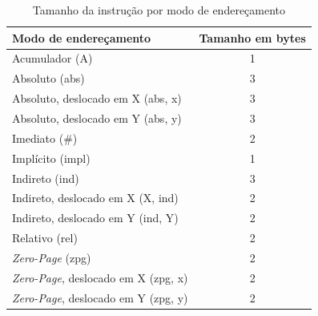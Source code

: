 \documentclass[
	12pt,				  %
	openright,		%
	a4paper,			%
	english,			%
	french,				%
	spanish,			%
	brazil,				%
]{abntex2}
\begin{document}
\begin{table}[htb]
	\centering
	\ABNTEXfontereduzida
	\caption{Tamanho da instrução por modo de endereçamento} \label{tab:Instr3OP}
	\begin{tabular}{|l|c|}
		\hline
		\textbf{Modo de endereçamento}            & \textbf{Tamanho em bytes} \\ \hline
		Acumulador (A)                            & 1                         \\ \hline
		Absoluto (abs)                            & 3                         \\ \hline
		Absoluto, deslocado em X (abs, x)         & 3                         \\ \hline
		Absoluto, deslocado em Y (abs, y)         & 3                         \\ \hline
		Imediato (\#)                             & 2                         \\ \hline
		Implícito (impl)                          & 1                         \\ \hline
		Indireto (ind)                            & 3                         \\ \hline
		Indireto, deslocado em X (X, ind)         & 2                         \\ \hline
		Indireto, deslocado em Y (ind, Y)         & 2                         \\ \hline
		Relativo (rel)                            & 2                         \\ \hline
		\emph{Zero-Page} (zpg)                    & 2                         \\ \hline
		\emph{Zero-Page}, deslocado em X (zpg, x) & 2                         \\ \hline
		\emph{Zero-Page}, deslocado em Y (zpg, y) & 2                         \\ \hline
	\end{tabular}
\end{table}



\end{document}
